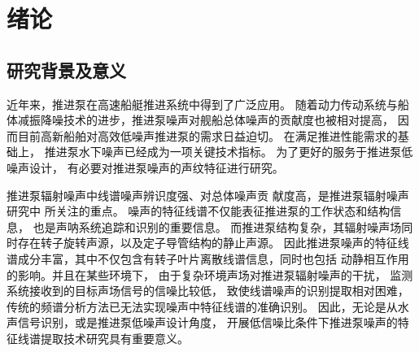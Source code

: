 \chapter{绪论}

\section{研究背景及意义}
近年来，推进泵在高速船艇推进系统中得到了广泛应用。
随着动力传动系统与船体减振降噪技术的进步，推进泵噪声对舰船总体噪声的贡献度也被相对提高，
因而目前高新船舶对高效低噪声推进泵的需求日益迫切\cite{ozdenUnderwaterRadiatedNoise2016}。
在满足推进性能需求的基础上，
推进泵水下噪声已经成为一项关键技术指标。
为了更好的服务于推进泵低噪声设计，
有必要对推进泵噪声的声纹特征进行研究。

\begin{comment}
推进泵噪声机理较为复杂，抛开空化噪声不谈仅从流致噪声角度考虑，其频谱已呈现宽带与线谱交叠的形貌。
推进泵内非定常流动与水力部件相互作用产生的流致激励是重要的噪声激励源，
推进泵噪声信号中蕴含着丰富的流致激励源信息，流致激励源特征能反映推进泵的运行状态和结构信息。
当推进泵内流动发生显著改变时，其噪声信号的低频声纹理特性也会发生变化。
无论是从特征声源信号识别，或是发展噪声能量主动控制技术角度，
构建推进泵流致激励源识别的有效方法，建立流致激励源特征与噪声信号之间的联系都尤为重要。
\end{comment}


推进泵辐射噪声中线谱噪声辨识度强、对总体噪声贡
献度高，是推进泵辐射噪声研究中
所关注的重点。
噪声的特征线谱不仅能表征推进泵的工作状态和结构信息，
也是声呐系统追踪和识别的重要信息。
而推进泵结构复杂，其辐射噪声场同时存在转子旋转声源，以及定子导管结构的静止声源。
因此推进泵噪声的特征线谱成分丰富，其中不仅包含有转子叶片离散线谱信息，同时也包括
动静相互作用的影响。并且在某些环境下，
由于复杂环境声场对推进泵辐射噪声的干扰，
监测系统接收到的目标声场信号的信噪比较低，
致使线谱噪声的识别提取相对困难，
传统的频谱分析方法已无法实现噪声中特征线谱的准确识别。
因此，无论是从水声信号识别，或是推进泵低噪声设计角度，
开展低信噪比条件下推进泵噪声的特征线谱提取技术研究具有重要意义。

